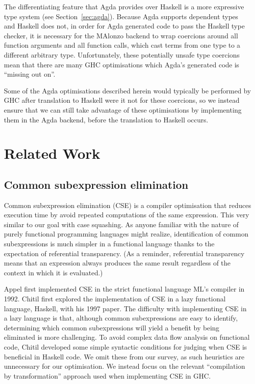 The differentiating feature that Agda provides over Haskell is a more expressive type system (see Section~\ref{sec:agda}). Because Agda supports dependent types and Haskell does not, in order for Agda generated code to pass the Haskell type checker, it is necessary for the MAlonzo backend to wrap coercions around all function arguments and all function calls, which cast terms from one type to a different arbitrary type. Unfortunately, these potentially unsafe type coercions mean that there are many GHC optimisations which Agda's generated code is ``missing out on''.\cite{fredriksson2011}

Some of the Agda optimisations described herein would typically be performed by GHC after translation to Haskell were it not for these coercions, so we instead ensure that we can still take advantage of these optimisations by implementing them in the Agda backend, before the translation to Haskell occurs.

\section{Related Work}
\label{sec:related_work}

\subsection{Common subexpression elimination}

Common subexpression elimination (CSE) is a compiler optimisation that reduces execution time by avoid repeated computations of the same expression.\cite{chitil1997} This very similar to our goal with case squashing. As anyone familiar with the nature of purely functional programming languages might realize, identification of common subexpressions is much simpler in a functional language thanks to the expectation of referential transparency.\cite{chitil1997} (As a reminder, referential transparency means that an expression always produces the same result regardless of the context in which it is evaluated.)

Appel first implemented CSE in the strict functional language ML's compiler in 1992.\cite{appel1992} Chitil first explored the implementation of CSE in a lazy functional language, Haskell, with his 1997 paper.\cite{chitil1997} The difficulty with implementing CSE in a lazy language is that, although common subexpressions are easy to identify, determining which common subexpressions will yield a benefit by being eliminated is more challenging. To avoid complex data flow analysis on functional code, Chitil developed some simple syntactic conditions for judging when CSE is beneficial in Haskell code.\cite{chitil1997} We omit these from our survey, as such heuristics are unnecessary for our optimisation. We instead focus on the relevant ``compilation by transformation'' approach used when implementing CSE in GHC.

